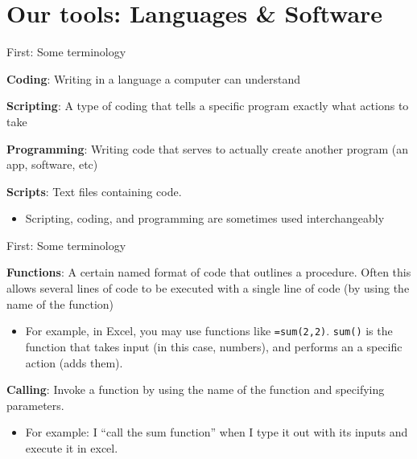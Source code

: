 \documentclass[
  ignorenonframetext,
]{beamer}
\providecommand{\tightlist}{%
  \setlength{\itemsep}{0pt}\setlength{\parskip}{0pt}}
\begin{document}
\hypertarget{our-tools-languages-software}{%
\section{Our tools: Languages \&
Software}\label{our-tools-languages-software}}

\begin{frame}{First: Some terminology}
\protect\hypertarget{first-some-terminology}{}

\textbf{Coding}: Writing in a language a computer can understand

\textbf{Scripting}: A type of coding that tells a specific program
exactly what actions to take

\textbf{Programming}: Writing code that serves to actually create
another program (an app, software, etc)

\textbf{Scripts}: Text files containing code.

\begin{itemize}
\tightlist
\item
  Scripting, coding, and programming are sometimes used interchangeably
\end{itemize}

\end{frame}

\begin{frame}[fragile]{First: Some terminology}
\protect\hypertarget{first-some-terminology-1}{}

\textbf{Functions}: A certain named format of code that outlines a
procedure. Often this allows several lines of code to be executed with a
single line of code (by using the name of the function)

\begin{itemize}
\tightlist
\item
  For example, in Excel, you may use functions like \texttt{=sum(2,2)}.
  \texttt{sum()} is the function that takes input (in this case,
  numbers), and performs an a specific action (adds them).
\end{itemize}

\textbf{Calling}: Invoke a function by using the name of the function
and specifying parameters.

\begin{itemize}
\tightlist
\item
  For example: I ``call the sum function'' when I type it out with its
  inputs and execute it in excel.
\end{itemize}

\end{frame}
\end{document}
